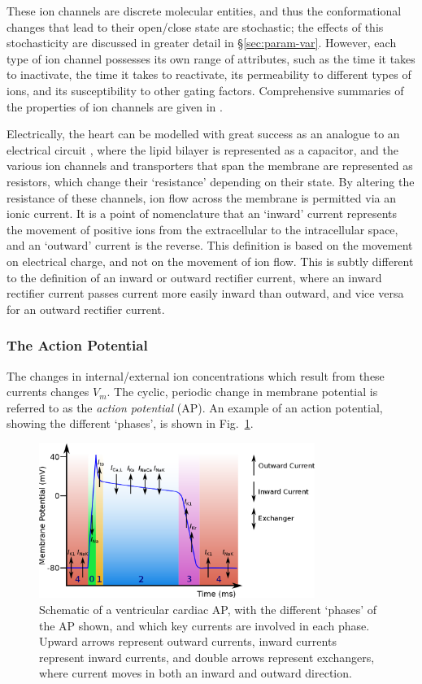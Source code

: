 \documentclass[../thesis-main.tex]{subfiles}
\begin{document}
These ion channels are discrete molecular entities, and thus the conformational changes that lead to their open/close state are stochastic; the effects of this stochasticity are discussed in greater detail in \S\ref{sec:param-var}. However, each type of ion channel possesses its own range of attributes, such as the time it takes to inactivate, the time it takes to reactivate, its permeability to different types of ions, and its susceptibility to other gating factors. Comprehensive summaries of the properties of ion channels are given in \citet{Carmeliet2002, Roden2002}.

Electrically, the heart can be modelled with great success as an analogue to an electrical circuit \citep{Carmeliet2002}, where the lipid bilayer is represented as a capacitor, and the various ion channels and transporters that span the membrane are represented as resistors, which change their `resistance' depending on their state. By altering the resistance of these channels, ion flow across the membrane is permitted via an ionic current. It is a point of nomenclature that an `inward' current represents the movement of positive ions from the extracellular to the intracellular space, and an `outward' current is the reverse. This definition is based on the movement on electrical charge, and not on the movement of ion flow. This is subtly different to the definition of an inward or outward rectifier current, where an inward rectifier current passes current more easily inward than outward, and vice versa for an outward rectifier current.

\subsubsection{The Action Potential}
\label{subsubsec:ap}
The changes in internal/external ion concentrations which result from these currents changes $V_m$. The cyclic, periodic change in membrane potential is referred to as the \emph{action potential} (AP). An example of an action potential, showing the different `phases', is shown in Fig.~\ref{fig:ap-structure}. 
\begin{figure}
 \centering
 \includegraphics[width=0.8\textwidth]{ap-structure-full}
 \caption[Schematic of a cardiac AP]{Schematic of a ventricular cardiac AP, with the different `phases' of the AP shown, and which key currents are involved in each phase. Upward arrows represent outward currents, inward currents represent inward currents, and double arrows represent exchangers, \idest{} where current moves in both an inward and outward direction.}
 \label{fig:ap-structure}
\end{figure}
\end{document}
